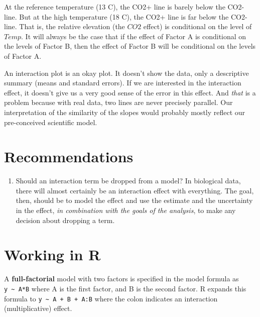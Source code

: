 \documentclass[]{book}
\providecommand{\tightlist}{%
  \setlength{\itemsep}{0pt}\setlength{\parskip}{0pt}}
\begin{document}
At the reference temperature (13 C), the CO2+ line is barely below the
CO2- line. But at the high temperature (18 C), the CO2+ line is far
below the CO2- line. That is, the relative elevation (the \(CO2\)
effect) is conditional on the level of \(Temp\). It will always be the
case that if the effect of Factor A is conditional on the levels of
Factor B, then the effect of Factor B will be conditional on the levels
of Factor A.

An interaction plot is an okay plot. It doesn't show the data, only a
descriptive summary (means and standard errors). If we are interested in
the interaction effect, it doesn't give us a very good sense of the
error in this effect. And \emph{that} is a problem because with real
data, two lines are never precisely parallel. Our interpretation of the
similarity of the slopes would probably mostly reflect our pre-conceived
scientific model.

\section{Recommendations}\label{recommendations-1}

\begin{enumerate}
\def\labelenumi{\arabic{enumi}.}
\tightlist
\item
  Should an interaction term be dropped from a model? In biological
  data, there will almost certainly be an interaction effect with
  everything. The goal, then, should be to model the effect and use the
  estimate and the uncertainty in the effect, \emph{in combination with
  the goals of the analysis}, to make any decision about dropping a
  term.
\end{enumerate}

\section{Working in R}\label{working-in-r-3}

A \textbf{full-factorial} model with two factors is specified in the
model formula as \texttt{y\ \textasciitilde{}\ A*B} where A is the first
factor, and B is the second factor. R expands this formula to
\texttt{y\ \textasciitilde{}\ A\ +\ B\ +\ A:B} where the colon indicates
an interaction (multiplicative) effect.
\end{document}
